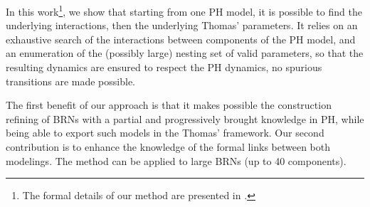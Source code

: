 In this work\footnote{The formal details of our method are presented in \cite{FPIMR12-CMSB}.}, we show that starting from one PH model,
it is possible to find the underlying interactions, then the underlying Thomas' parameters.
It relies on an exhaustive search of the interactions between components of the PH model,
and an enumeration of the (possibly large) nesting set of valid parameters,
so that the resulting dynamics are ensured to respect the PH dynamics, \ie no spurious transitions are made possible.

The first benefit of our approach is that it makes possible the construction refining of BRNs with a partial and progressively brought knowledge in PH, while being able to export such models in the Thomas' framework.
Our second contribution is to enhance the knowledge of the formal links between both modelings.
The method can be applied to large BRNs (up to 40 components).

\begin{comment}
\paragraph{Outline.}
\pref{sec:frameworks} recalls the PH and Thomas frameworks;
\pref{sec:infer-IG} defines the IG inference from PH;
\pref{sec:infer-K} details the enumeration of Thomas parametrizations compatible with a PH;
\pref{sec:examples} gives some information about the implementation of the method.
\end{comment}
